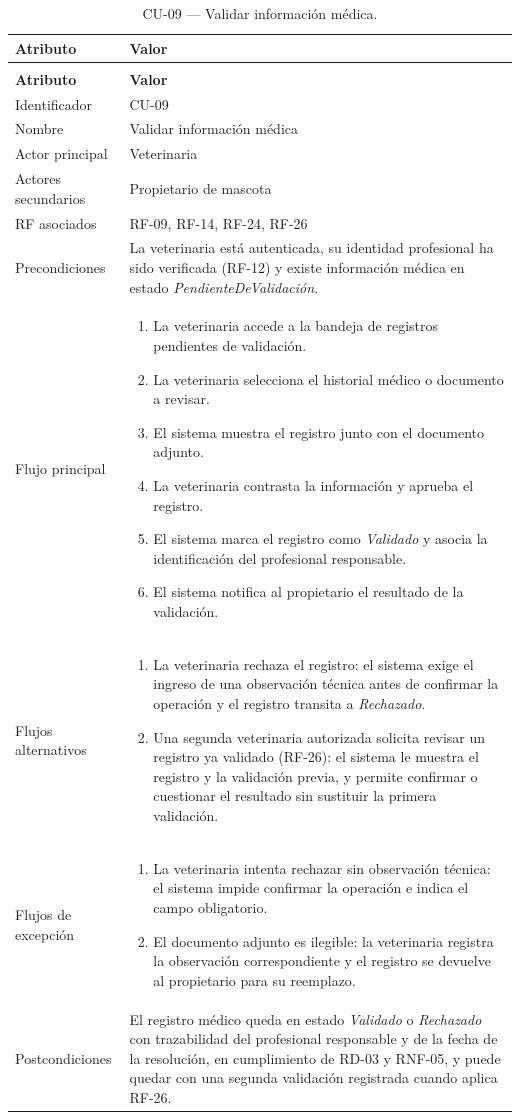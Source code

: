 \documentclass[journal,onecolumn]{IEEEtran}
\makeatletter
\newenvironment{atributos}[2]{%
	\small
	\begin{longtable}{@{}>{\raggedright\arraybackslash}p{4.2cm} >{\raggedright\arraybackslash}p{11.2cm}@{}}
		\caption{#2}\label{tab:#1}\\
		\toprule
		\textbf{Atributo} & \textbf{Valor} \\
		\midrule
		\endfirsthead
		\multicolumn{2}{@{}l}{\small\itshape (continuación)}\\
		\toprule
		\textbf{Atributo} & \textbf{Valor} \\
		\midrule
		\endhead
		\bottomrule
		\endlastfoot
	}{%
	\end{longtable}
	\normalsize
}
\makeatother
\begin{document}
	\begin{atributos}{CU-09}{CU-09 --- Validar información médica.}
		Identificador & CU-09 \\
		Nombre & Validar información médica \\
		Actor principal & Veterinaria \\
		Actores secundarios & Propietario de mascota \\
		RF asociados & RF-09, RF-14, RF-24, RF-26 \\
		Precondiciones & La veterinaria está autenticada, su identidad profesional ha sido verificada (RF-12) y existe información médica en estado \emph{PendienteDeValidación}. \\
		Flujo principal &
		\begin{enumerate}[leftmargin=*, nosep]
			\item La veterinaria accede a la bandeja de registros pendientes de validación.
			\item La veterinaria selecciona el historial médico o documento a revisar.
			\item El sistema muestra el registro junto con el documento adjunto.
			\item La veterinaria contrasta la información y aprueba el registro.
			\item El sistema marca el registro como \emph{Validado} y asocia la identificación del profesional responsable.
			\item El sistema notifica al propietario el resultado de la validación.
		\end{enumerate} \\
		Flujos alternativos &
		\begin{enumerate}[leftmargin=*, nosep]
			\item[4.1] La veterinaria rechaza el registro: el sistema exige el ingreso de una observación técnica antes de confirmar la operación y el registro transita a \emph{Rechazado}.
			\item[5.1] Una segunda veterinaria autorizada solicita revisar un registro ya validado (RF-26): el sistema le muestra el registro y la validación previa, y permite confirmar o cuestionar el resultado sin sustituir la primera validación.
		\end{enumerate} \\
		Flujos de excepción &
		\begin{enumerate}[leftmargin=*, nosep]
			\item[4.2] La veterinaria intenta rechazar sin observación técnica: el sistema impide confirmar la operación e indica el campo obligatorio.
			\item[3.1] El documento adjunto es ilegible: la veterinaria registra la observación correspondiente y el registro se devuelve al propietario para su reemplazo.
		\end{enumerate} \\
		Postcondiciones & El registro médico queda en estado \emph{Validado} o \emph{Rechazado} con trazabilidad del profesional responsable y de la fecha de la resolución, en cumplimiento de RD-03 y RNF-05, y puede quedar con una segunda validación registrada cuando aplica RF-26. \\
	\end{atributos}
	
\end{document}
